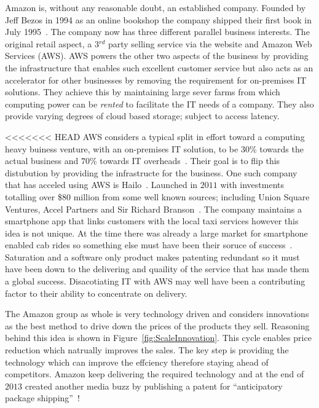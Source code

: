 {}

Amazon is, without any reasonable doubt, an established company.
Founded by Jeff Bezos in 1994 as an online bookshop the company shipped their first book in July 1995~\cite{seattle}.
The company now has three different parallel business interests.
The original retail aspect, a 3$^{rd}$ party selling service via the website and Amazon Web Services (AWS).
AWS powers the other two aspects of the business by providing the infrastructure that enables such excellent customer service but also acts as an accelerator for other businesses by removing the requirement for on-premises IT solutions.
They achieve this by maintaining large sever farms from which computing power can be \emph{rented} to facilitate the IT needs of a company.
They also provide varying degrees of cloud based storage; subject to access latency.

<<<<<<< HEAD
AWS considers a typical split in effort toward a computing heavy buiness venture, with an on-premises IT solution, to be $30$\% towards the actual business and $70$\% towards IT overheads~\cite{gavin2014ams}. 
Their goal is to flip this distubution by providing the infrastructe for the business. 
One such company that has acceled using AWS is Hailo~\cite{gavin2014ams}.
Launched in $2011$ with investments totalling over \$$80$ million from some well known sources; including Union Square Ventures, Accel Partners and Sir Richard Branson~\cite{hailo}.
The company maintains a smartphone app that links customers with the local taxi services however this idea is not unique.
At the time there was already a large market for smartphone enabled cab rides so something else must have been their soruce of success~\cite{ventureBeat}.
Saturation and a software only product makes patenting redundant so it must have been down to the delivering and quaility of the service that has made them a global success.
Disacotiating IT with AWS may well have been a contributing factor to their ability to concentrate on delivery.


The Amazon group as whole is very technology driven and considers innovations as the best method to drive down the prices of the products they sell.
Reasoning behind this idea is shown in Figure~\ref{fig:ScaleInnovation}.
This cycle enables price reduction which natrually improves the sales.
The key step is providing the technology which can improve the effciency therefore staying ahead of competitors.
Amazon keep delivering the required technology and at the end of $2013$ created another media buzz by publishing a patent for ``anticipatory package shipping''~\cite{spiegel2013method}! 

